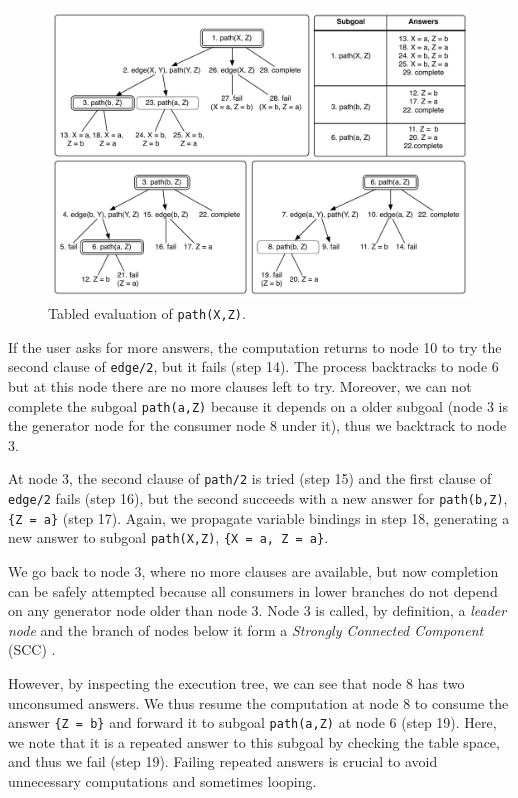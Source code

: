 \begin{figure}[ht]
  \centering
    \includegraphics[scale=0.6]{tabling_path.pdf}
  \caption{Tabled evaluation of \texttt{path(X,Z)}.}
  \label{fig:tabling_path}
\end{figure}

If the user asks for more answers, the computation returns to node 10 to try the second clause of
\texttt{edge/2}, but it fails (step 14). The process backtracks to node 6 but at this node there
are no more clauses left to try. Moreover, we can not complete the subgoal \texttt{path(a,Z)} because
it depends on a older subgoal (node 3 is the generator node for the consumer node 8 under it), thus we backtrack to node 3.

At node 3, the second clause of \texttt{path/2} is tried (step 15) and the first clause of
\texttt{edge/2} fails (step 16), but the second succeeds with a new answer for \texttt{path(b,Z)},
\texttt{\{Z~=~a\}} (step 17). Again, we propagate variable bindings in step 18, generating a new
answer to subgoal \texttt{path(X,Z)}, \texttt{\{X~=~a,~Z~=~a\}}.

We go back to node 3, where no more clauses are available, but now completion can be safely
attempted because all consumers in lower branches do not depend on any generator node older
than node 3. Node 3 is called, by definition, a \textit{leader node} and the branch of nodes
below it form a \textit{Strongly Connected Component} (SCC) \cite{Tarjan-72}.

However, by inspecting the execution tree, we can see that node 8 has two unconsumed answers.
We thus resume the computation at node 8 to consume the answer \texttt{\{Z~=~b\}} and forward it to subgoal
\texttt{path(a,Z)} at node 6 (step 19). Here, we note that it is a repeated answer
to this subgoal by checking the table space, and thus we fail (step 19).
Failing repeated answers is crucial to avoid unnecessary computations and sometimes looping.

